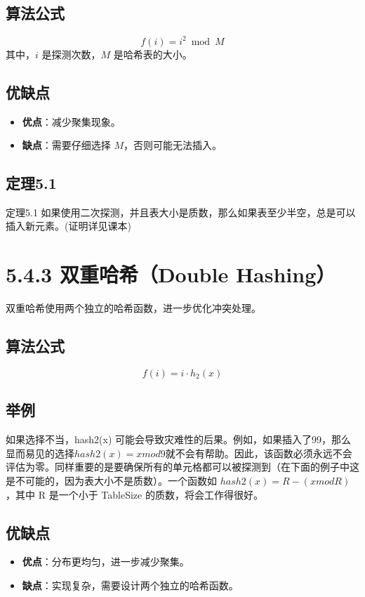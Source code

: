 \documentclass[a4paper,12pt]{article}
\begin{document}
\subsection*{算法公式}
\[
f(i) = i^2 \bmod M
\]
其中，\( i \) 是探测次数，\( M \) 是哈希表的大小。

\subsection*{优缺点}
\begin{itemize}
    \item \textbf{优点}：减少聚集现象。
    \item \textbf{缺点}：需要仔细选择 \( M \)，否则可能无法插入。
\end{itemize}

\subsection*{定理5.1}
定理5.1 如果使用二次探测，并且表大小是质数，那么如果表至少半空，总是可以插入新元素。(证明详见课本)


\section{5.4.3 双重哈希（Double Hashing）}
双重哈希使用两个独立的哈希函数，进一步优化冲突处理。

\subsection*{算法公式}
\[
f(i) = i·h_2(x)
\]

\subsection*{举例}
如果选择不当，hash2(x) 可能会导致灾难性的后果。例如，如果插入了99，那么显而易见的选择$ hash2(x) = x mod 9 $就不会有帮助。因此，该函数必须永远不会评估为零。同样重要的是要确保所有的单元格都可以被探测到（在下面的例子中这是不可能的，因为表大小不是质数）。一个函数如 $hash2(x) = R - (x mod R)$，其中 R 是一个小于 TableSize 的质数，将会工作得很好。

\subsection*{优缺点}
\begin{itemize}
    \item \textbf{优点}：分布更均匀，进一步减少聚集。
    \item \textbf{缺点}：实现复杂，需要设计两个独立的哈希函数。
\end{itemize}
\end{document}
